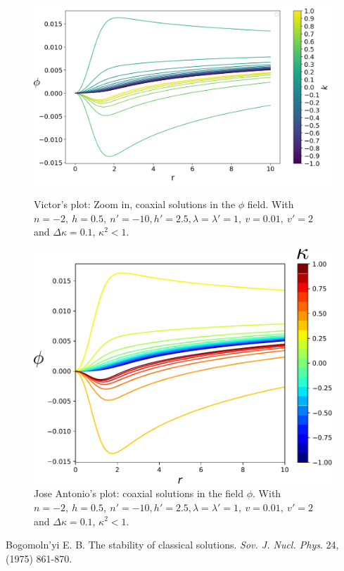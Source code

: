 \documentclass[12pt,a4paper]{article}
\begin{document}
\begin{figure}
	\centering
	\includegraphics[scale=0.5]{JA1.pdf}
		\caption{Victor's plot: Zoom in, coaxial solutions in the $\phi$ field. With $n = -2,\  h = 0.5,\ n' = -10, h' = 2.5, \lambda=\lambda' = 1,\ v =0.01,\ v' = 2 $ and $\Delta \kappa = 0.1$, $\kappa^2<1$.}
		\label{fig:victor}
		\includegraphics[scale=0.8]{jacoaxial1.pdf}
	\caption{Jose Antonio's plot: coaxial solutions in the field $\phi$. With $n = -2,\  h = 0.5,\ n' = -10, h' = 2.5, \lambda=\lambda' = 1,\ v =0.01,\ v' = 2 $ and  $\Delta \kappa = 0.1$, $\kappa^2<1$.}
	\label{fig:ja}
\end{figure}

\begin{thebibliography}{9}
 Bogomoln'yi E. B. The stability of classical solutions. \emph{Sov. J. Nucl. Phys}. 24, (1975) 861-870.

\end{thebibliography}
\end{document}
